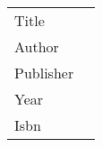 

\begin{table}[H]
    \begin{tabular}{@{·}l@{ : }l}
        Title     &     \\
        Author    &     \\
        Publisher &     \\
        Year      &     \\
        Isbn      &
    \end{tabular}
\end{table}

